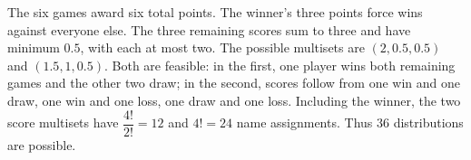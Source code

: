The six games award six total points. The winner's three points force wins against everyone else. The three remaining scores sum to three and have minimum $0.5$, with each at most two. The possible multisets are $(2,0.5,0.5)$ and $(1.5,1,0.5)$. Both are feasible: in the first, one player wins both remaining games and the other two draw; in the second, scores follow from one win and one draw, one win and one loss, one draw and one loss. Including the winner, the two score multisets have $\dfrac{4!}{2!}=12$ and $4!=24$ name assignments. Thus $\boxed{36}$ distributions are possible.
